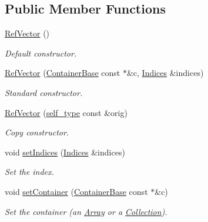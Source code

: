 \subsection*{Public Member Functions}
\begin{DoxyCompactItemize}
\item 
\hyperlink{classpanda_1_1RefVector_abf4109e5a3416a34cf08b38254be453d}{RefVector} ()
\begin{DoxyCompactList}\small\item\em Default constructor. \item\end{DoxyCompactList}\item 
\hyperlink{classpanda_1_1RefVector_ae57df86fdbdbf19bb5e9cf6dc03de029}{RefVector} (\hyperlink{classpanda_1_1ContainerBase}{ContainerBase} const $\ast$\&c, \hyperlink{classpanda_1_1RefVector_a062e47758de4bd1c58242267d4aabef8}{Indices} \&indices)
\begin{DoxyCompactList}\small\item\em Standard constructor. \item\end{DoxyCompactList}\item 
\hyperlink{classpanda_1_1RefVector_ad55015318ec150fd6e37dfa6941cb0b7}{RefVector} (\hyperlink{classpanda_1_1RefVector}{self\_\-type} const \&orig)
\begin{DoxyCompactList}\small\item\em Copy constructor. \item\end{DoxyCompactList}\item 
void \hyperlink{classpanda_1_1RefVector_ad892af7b109e53efa169067dd58c5118}{setIndices} (\hyperlink{classpanda_1_1RefVector_a062e47758de4bd1c58242267d4aabef8}{Indices} \&indices)
\begin{DoxyCompactList}\small\item\em Set the index. \item\end{DoxyCompactList}\item 
void \hyperlink{classpanda_1_1RefVector_aa820237bf37060e712958a33cce074fd}{setContainer} (\hyperlink{classpanda_1_1ContainerBase}{ContainerBase} const $\ast$\&c)
\begin{DoxyCompactList}\small\item\em Set the container (an \hyperlink{classpanda_1_1Array}{Array} or a \hyperlink{classpanda_1_1Collection}{Collection}). \item\end{DoxyCompactList}\item 

\end{DoxyCompactItemize}
